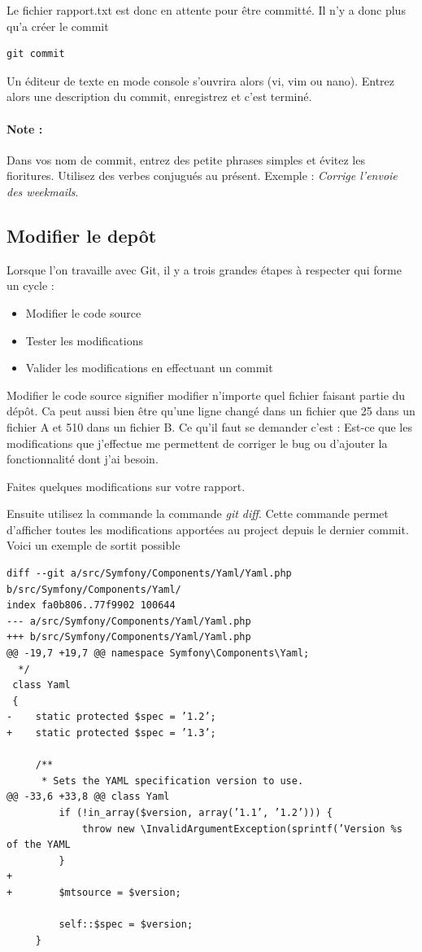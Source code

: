 \documentclass[a4paper]{article}
\begin{document}
Le fichier rapport.txt est donc en attente pour être committé. Il n'y a donc plus qu'a créer le commit

\begin{verbatim}
git commit
\end{verbatim}

Un éditeur de texte en mode console s'ouvrira alors (vi, vim ou nano). Entrez alors une description du commit, enregistrez et c'est terminé.

\paragraph{Note :}Dans vos nom de commit, entrez des petite phrases simples et évitez les fioritures. Utilisez des verbes conjugués au présent. Exemple : \textit{Corrige l'envoie des weekmails}.

\subsection{Modifier le dep\^ot}

Lorsque l'on travaille avec Git, il y a trois grandes étapes à respecter qui forme un cycle : 
\begin{itemize}
\item Modifier le code source
\item Tester les modifications
\item Valider les modifications en effectuant un commit
\end{itemize}

Modifier le code source signifier modifier n'importe quel fichier faisant partie du dép\^ot. Ca peut aussi bien être qu'une ligne changé dans un fichier que 25 dans un fichier A et 510 dans un fichier B. Ce qu'il faut se demander c'est : Est-ce que les modifications que j'effectue me permettent de corriger le bug ou d'ajouter la fonctionnalité dont j'ai besoin.

Faites quelques modifications sur votre rapport.

Ensuite utilisez la commande la commande \textit{git diff}. Cette commande permet d'afficher toutes les modifications apportées au project depuis le dernier commit. Voici un exemple de sortit possible

\begin{verbatim}
diff --git a/src/Symfony/Components/Yaml/Yaml.php b/src/Symfony/Components/Yaml/
index fa0b806..77f9902 100644
--- a/src/Symfony/Components/Yaml/Yaml.php
+++ b/src/Symfony/Components/Yaml/Yaml.php
@@ -19,7 +19,7 @@ namespace Symfony\Components\Yaml;
  */
 class Yaml
 {
-    static protected $spec = ’1.2’;
+    static protected $spec = ’1.3’;

     /**
      * Sets the YAML specification version to use.
@@ -33,6 +33,8 @@ class Yaml
         if (!in_array($version, array(’1.1’, ’1.2’))) {
             throw new \InvalidArgumentException(sprintf(’Version %s of the YAML
         }
+
+        $mtsource = $version;

         self::$spec = $version;
     }
\end{verbatim}
\end{document}
